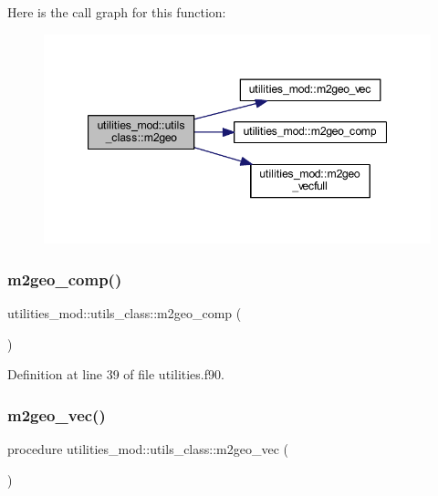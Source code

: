 Here is the call graph for this function\+:\nopagebreak
\begin{figure}[H]
\begin{center}
\leavevmode
\includegraphics[width=347pt]{structutilities__mod_1_1utils__class_a56c02806fb02449b066f44e73784c835_cgraph}
\end{center}
\end{figure}
\mbox{\label{structutilities__mod_1_1utils__class_a8cceeee65240f821428cd4dc65fd5fa0}} 
\subsubsection{\texorpdfstring{m2geo\+\_\+comp()}{m2geo\_comp()}}
{\footnotesize\ttfamily utilities\+\_\+mod\+::utils\+\_\+class\+::m2geo\+\_\+comp (\begin{DoxyParamCaption}{ }\end{DoxyParamCaption})\hspace{0.3cm}{\ttfamily [private]}}



Definition at line 39 of file utilities.\+f90.

\mbox{\label{structutilities__mod_1_1utils__class_a8319bf9d14dd225be0f30f5e0c1f04e3}} 
\subsubsection{\texorpdfstring{m2geo\+\_\+vec()}{m2geo\_vec()}}
{\footnotesize\ttfamily procedure utilities\+\_\+mod\+::utils\+\_\+class\+::m2geo\+\_\+vec (\begin{DoxyParamCaption}{ }\end{DoxyParamCaption})\hspace{0.3cm}{\ttfamily [private]}}



